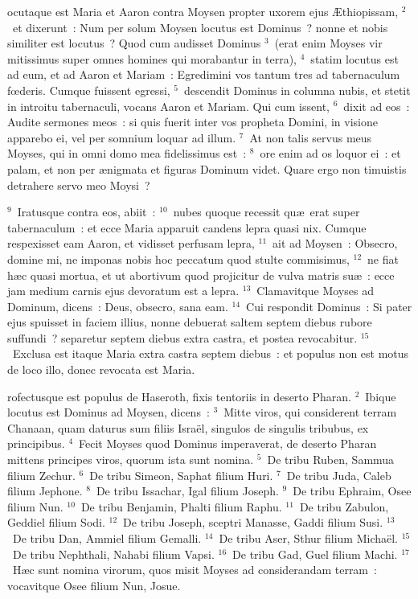 \bchapter
{}ocutaque est Maria et Aaron contra Moysen propter uxorem ejus \AE thiopissam,
${}^{2}$~et dixerunt~: Num per solum Moysen locutus est Dominus~? nonne et nobis similiter est locutus~? Quod cum audisset Dominus
${}^{3}$~(erat enim Moyses vir mitissimus super omnes homines qui morabantur in terra),
${}^{4}$~statim locutus est ad eum, et ad Aaron et Mariam~: Egredimini vos tantum tres ad tabernaculum fœderis. Cumque fuissent egressi,
${}^{5}$~descendit Dominus in columna nubis, et stetit in introitu tabernaculi, vocans Aaron et Mariam. Qui cum issent,
${}^{6}$~dixit ad eos~: Audite sermones meos~: si quis fuerit inter vos propheta Domini, in visione apparebo ei, vel per somnium loquar ad illum.
${}^{7}$~At non talis servus meus Moyses, qui in omni domo mea fidelissimus est~:
${}^{8}$~ore enim ad os loquor ei~: et palam, et non per \ae nigmata et figuras Dominum videt. Quare ergo non timuistis detrahere servo meo Moysi~?


${}^{9}$~Iratusque contra eos, abiit~:
${}^{10}$~nubes quoque recessit qu\ae\ erat super tabernaculum~: et ecce Maria apparuit candens lepra quasi nix. Cumque respexisset eam Aaron, et vidisset perfusam lepra,
${}^{11}$~ait ad Moysen~: Obsecro, domine mi, ne imponas nobis hoc peccatum quod stulte commisimus,
${}^{12}$~ne fiat h\ae c quasi mortua, et ut abortivum quod projicitur de vulva matris su\ae~: ecce jam medium carnis ejus devoratum est a lepra.
${}^{13}$~Clamavitque Moyses ad Dominum, dicens~: Deus, obsecro, sana eam.
${}^{14}$~Cui respondit Dominus~: Si pater ejus spuisset in faciem illius, nonne debuerat saltem septem diebus rubore suffundi~? separetur septem diebus extra castra, et postea revocabitur.
${}^{15}$~Exclusa est itaque Maria extra castra septem diebus~: et populus non est motus de loco illo, donec revocata est Maria.

\bchapter
{}rofectusque est populus de Haseroth, fixis tentoriis in deserto Pharan.
${}^{2}$~Ibique locutus est Dominus ad Moysen, dicens~:
${}^{3}$~Mitte viros, qui considerent terram Chanaan, quam daturus sum filiis Isra\"el, singulos de singulis tribubus, ex principibus.
${}^{4}$~Fecit Moyses quod Dominus imperaverat, de deserto Pharan mittens principes viros, quorum ista sunt nomina.
${}^{5}$~De tribu Ruben, Sammua filium Zechur.
${}^{6}$~De tribu Simeon, Saphat filium Huri.
${}^{7}$~De tribu Juda, Caleb filium Jephone.
${}^{8}$~De tribu Issachar, Igal filium Joseph.
${}^{9}$~De tribu Ephraim, Osee filium Nun.
${}^{10}$~De tribu Benjamin, Phalti filium Raphu.
${}^{11}$~De tribu Zabulon, Geddiel filium Sodi.
${}^{12}$~De tribu Joseph, sceptri Manasse, Gaddi filium Susi.
${}^{13}$~De tribu Dan, Ammiel filium Gemalli.
${}^{14}$~De tribu Aser, Sthur filium Micha\"el.
${}^{15}$~De tribu Nephthali, Nahabi filium Vapsi.
${}^{16}$~De tribu Gad, Guel filium Machi.
${}^{17}$~H\ae c sunt nomina virorum, quos misit Moyses ad considerandam terram~: vocavitque Osee filium Nun, Josue.


